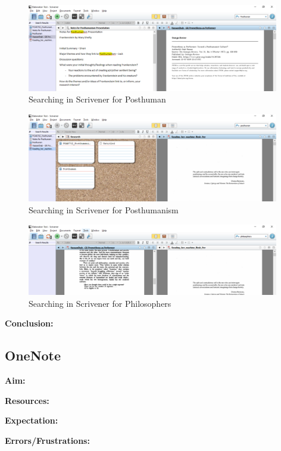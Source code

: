 \documentclass{article}
\begin{document}
\begin{figure}[htbp]
    \centering
    \includegraphics[width=11cm]{Images/ScrivenerTest004.PNG}
    \caption{Searching in Scrivener for Posthuman}
    \label{fig:Scrivener Search Posthuman}
\end{figure}

\begin{figure}[htbp]
    \centering
    \includegraphics[width=11cm]{Images/ScrivenerTest005.PNG}
    \caption{Searching in Scrivener for Posthumanism}
    \label{fig:Scrivener Search Posthumanism}
\end{figure}


\begin{figure}[htbp]
    \centering
    \includegraphics[width=11cm]{Images/ScrivenerTest006.PNG}
    \caption{Searching in Scrivener for Philosophers}
    \label{fig:Scrivener Search Philosophers}
\end{figure}
\textbf{Conclusion:}


\subsection{OneNote}

\textbf{Aim:}

\textbf{Resources:}

\textbf{Expectation:}

\label{Error: OneNote Errors/Frustrations}
\textbf{Errors/Frustrations:}
\end{document}
